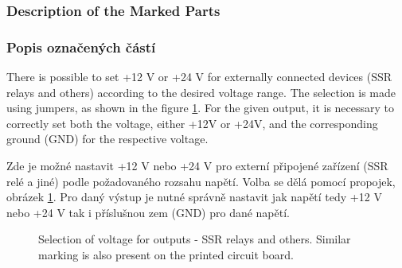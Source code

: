 
\begin{English}
\subsubsection{Description of the Marked Parts}
\end{English}

\begin{Czech}
\subsubsection{Popis označených částí}
\end{Czech}


\begin{English}
\end{English}

\begin{Czech}
\end{Czech}


\begin{English}
There is possible to set +12 V or +24 V for externally connected devices (SSR relays and others) according to the desired voltage range. The selection is made using jumpers, as shown in the figure \ref{fig:pin-header-relays}. For the given output, it is necessary to correctly set both the voltage, either +12V or +24V, and the corresponding ground (GND) for the respective voltage.
\end{English}

\begin{Czech}
Zde je možné nastavit +12 V nebo +24 V pro externí připojené zařízení (SSR relé a jiné) podle požadovaného rozsahu napětí. Volba se dělá pomocí propojek, obrázek \ref{fig:pin-header-relays}. Pro daný výstup je nutné správně nastavit jak napětí tedy +12 V nebo +24 V tak i příslušnou zem (GND) pro dané napětí.
\end{Czech}


\begin{English}
\begin{figure}[H]
    \centering
    \def\svgwidth{0.25\columnwidth}
    \graphicspath{{pictures/all/hardware/svg/}}
    
    \caption{Selection of voltage for outputs - SSR relays and others. Similar marking is also present on the printed circuit board.}
    \label{fig:pin-header-relays}
\end{figure}
\end{English}


